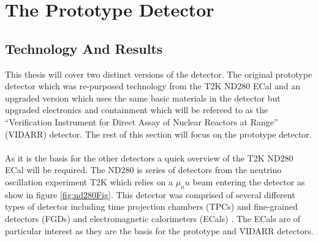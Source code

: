 
\chapter{The Prototype Detector}\label{Chp:ThePrototypeDetector}

\ifpdf
    \graphicspath{{Chapter2/Figs/Raster/}{Chapter2/Figs/PDF/}{Chapter2/Figs/}}
\else
    \graphicspath{{Chapter2/Figs/Vector/}{Chapter2/Figs/}}
\fi

\section{Technology And Results}
This thesis will cover two distinct versions of the detector. The original prototype detector which was re-purposed technology from the T2K ND280 ECal \cite{Allan_2013} and an upgraded version which uses the same basic materials in the detector but upgraded electronics and containment which will be refereed to as the ``Verification Instrument for Direct Assay of Nuclear Reactors at Range'' (VIDARR) detector. The rest of this section will focus on the prototype detector.
\\\\As it is the basis for the other detectors a quick overview of the T2K ND280 ECal will be required. The ND280 is series of detectors from the neutrino oscillation experiment T2K which relies on a $\mu_nu$ beam entering the detector as show in figure \ref{fig:nd280Fig}. This detector was comprised of several different types of detector including time projection chambers (TPCs) and fine-grained detectors (FGDs) and electromagnetic calorimeters (ECals) \cite{Allan_2013}. The ECals are of particular interest as they are the basis for the prototype and VIDARR detectors. 

